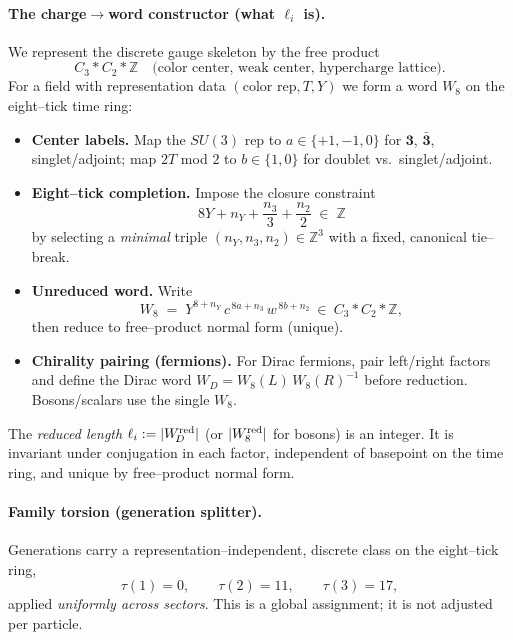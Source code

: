 \documentclass[epjc3]{svjour3}
\begin{document}
\paragraph{The charge$\to$word constructor (what $\ell_i$ is).}
We represent the discrete gauge skeleton by the free product
\[
C_3 * C_2 * \mathbb Z
\quad\text{(color center, weak center, hypercharge lattice).}
\]
For a field with representation data $(\text{color rep},T,Y)$ we form a word $W_8$ on the eight–tick time ring:
\begin{itemize}
  \item \textbf{Center labels.} Map the $SU(3)$ rep to $a\in\{+1,-1,0\}$ for $\mathbf 3$, $\bar{\mathbf 3}$, singlet/adjoint; map $2T$ mod $2$ to $b\in\{1,0\}$ for doublet vs.\ singlet/adjoint.
  \item \textbf{Eight–tick completion.} Impose the closure constraint
        \[
        8Y + n_Y + \frac{n_3}{3} + \frac{n_2}{2}\;\in\;\mathbb Z
        \]
        by selecting a \emph{minimal} triple $(n_Y,n_3,n_2)\in\mathbb Z^3$ with a fixed, canonical tie–break.
  \item \textbf{Unreduced word.} Write
        \[
        W_8 \;=\; Y^{8+n_Y}\,c^{\,8a+n_3}\,w^{\,8b+n_2}\ \in\ C_3 * C_2 * \mathbb Z,
        \]
        then reduce to free–product normal form (unique).
  \item \textbf{Chirality pairing (fermions).} For Dirac fermions, pair left/right factors and define the Dirac word
        $W_{\!D}=W_8(L)\,W_8(R)^{-1}$ before reduction. Bosons/scalars use the single $W_8$.
\end{itemize}
The \emph{reduced length} $\ell_i := |W_{\!D}^{\rm red}|$ (or $|W_8^{\rm red}|$ for bosons) is an integer.
It is invariant under conjugation in each factor, independent of basepoint on the time ring, and unique by free–product normal form.

\paragraph{Family torsion (generation splitter).}
Generations carry a representation–independent, discrete class on the eight–tick ring,
\[
\tau(1)=0,\qquad \tau(2)=11,\qquad \tau(3)=17,
\]
applied \emph{uniformly across sectors}. This is a global assignment; it is not adjusted per particle.
\end{document}

